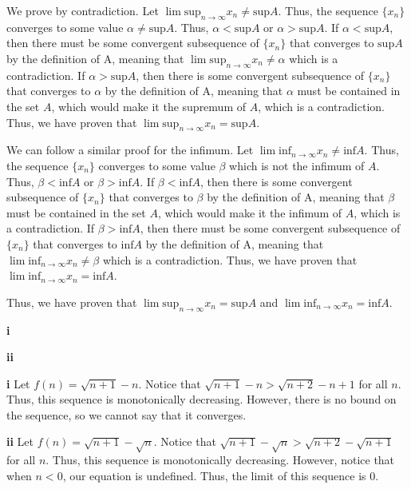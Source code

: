 \documentclass[addpoints]{exam}
\begin{document}
\begin{questions}
\question We prove by contradiction. Let $\lim\text{sup}_{n \to \infty} x_n \neq \text{sup} A$. Thus, the sequence $\{x_n\}$ converges to some 
value $\alpha \neq \text{sup} A$. Thus, $\alpha < \text{sup} A$ or $\alpha > \text{sup} A$. If $\alpha < \text{sup} A$, then there 
must be some convergent subsequence of $\{x_n\}$ that converges to $\text{sup} A$ by the definition of A, meaning that 
$\lim\text{sup}_{n \to \infty} x_n \neq \alpha$ which is a contradiction. If $\alpha > \text{sup} A$, then there is some convergent subsequence
of $\{x_n\}$ that converges to $\alpha$ by the definition of A, meaning that $\alpha$ must be contained in the set $A$, which would make it 
the supremum of $A$, which is a contradiction. Thus, we have proven that $\lim\text{sup}_{n \to \infty} x_n = \text{sup} A$.

We can follow a similar proof for the infimum. Let $\lim\text{inf}_{n \to \infty} x_n \neq \text{inf} A$. 
Thus, the sequence $\{x_n\}$ converges to some value $\beta$ which is not the infimum of $A$. Thus, $\beta < \text{inf} A$ or
$\beta > \text{inf} A$. If $\beta < \text{inf} A$, then there is some convergent subsequence of $\{x_n\}$ that converges to $\beta$ by the
definition of A, meaning that $\beta$ must be contained in the set $A$, which would make it the infimum of $A$, which is a contradiction.
If $\beta > \text{inf} A$, then there must be some convergent subsequence of $\{x_n\}$ that converges to $\text{inf} A$ by the definition of A,
meaning that $\lim\text{inf}_{n \to \infty} x_n \neq \beta$ which is a contradiction. Thus, we have proven that $\lim\text{inf}_{n \to \infty} x_n = \text{inf} A$.

Thus, we have proven that $\lim\text{sup}_{n \to \infty} x_n = \text{sup} A$ and $\lim\text{inf}_{n \to \infty} x_n = \text{inf} A$.

\question 

\textbf{i} 

\textbf{ii}

\question

\textbf{i} Let $f(n) = \sqrt{n + 1} - n$. Notice that $\sqrt{n + 1} - n > \sqrt{n + 2} - n + 1$ for all $n$. Thus, this 
sequence is monotonically decreasing. However, there is no bound on the sequence, so we cannot say that it converges.

\textbf{ii} Let $f(n) = \sqrt{n+1} - \sqrt{n}$. Notice that $\sqrt{n+1} - \sqrt{n} > \sqrt{n+2} - \sqrt{n+1}$ for all $n$. Thus, this
sequence is monotonically decreasing. However, notice that when $n < 0$, our equation is undefined. Thus, the limit 
of this sequence is 0. 


\end{questions}
\end{document}
